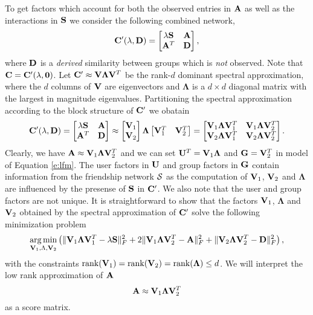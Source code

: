 To get factors which account for both the observed entries in $\mathbf{A}$ as well as the interactions in $\mathbf{S}$ we consider the following combined network,
\begin{equation}
\mathbf{C}'(\lambda, \mathbf{D}) =
\begin{bmatrix}
\lambda \mathbf{S} & \mathbf{A} \\
\mathbf{A}^T & \mathbf{D}
\end{bmatrix},
\label{e:generalizedCombined}
\end{equation}
where $\mathbf{D}$ is a \emph{derived} similarity between groups which is \emph{not} observed. Note that $\mathbf{C} = \mathbf{C}'(\lambda, \mathbf{0})$. Let $\mathbf{C}' \approx \mathbf{V} \mathbf{\Lambda} \mathbf{V}^T$ be the rank-$d$ dominant spectral approximation, where the $d$ columns of $\mathbf{V}$ are eigenvectors and $\mathbf{\Lambda}$ is a $d \times d$ diagonal matrix with the largest in magnitude eigenvalues. Partitioning the spectral approximation according to the block structure of $\mathbf{C}'$ we obatain 
\[
\mathbf{C}'(\lambda, \mathbf{D})  = 
\begin{bmatrix}
\lambda \mathbf{S} & \mathbf{A} \\
\mathbf{A}^T & \mathbf{D}
\end{bmatrix}
\approx 
 \begin{bmatrix}
 \mathbf{V}_1 \\
 \mathbf{V}_2
 \end{bmatrix}
\mathbf{\Lambda}
\begin{bmatrix}
\mathbf{V}_1^T & \mathbf{V}_2^T
\end{bmatrix} = 
\begin{bmatrix}
\mathbf{V}_1 \mathbf{\Lambda} \mathbf{V}_1^T & \mathbf{V}_1 \mathbf{\Lambda} \mathbf{V}_2^T  \\
\mathbf{V}_2 \mathbf{\Lambda} \mathbf{V}_1^T & \mathbf{V}_2 \mathbf{\Lambda} \mathbf{V}_2^T 
\end{bmatrix}.
\]
Clearly, we have $\mathbf{A} \approx \mathbf{V}_1 \mathbf{\Lambda} \mathbf{V}_2^T$ and we can set $\mathbf{U}^T = \mathbf{V}_1 \mathbf{\Lambda} $ and $ \mathbf{G} = \mathbf{V}_2^T$ in model of Equation \eqref{e:lfm}. The user factors in $\mathbf{U}$ and group factors in $\mathbf{G}$ contain information from the friendship network $\mathcal{S}$ as the computation of $\mathbf{V}_1$, $\mathbf{V}_2$ and $\mathbf{\Lambda}$ are influenced by the presense of $\mathbf{S}$ in $\mathbf{C}'$. We also note that the user and group factors are not unique. It is straightforward to show that the factors $\mathbf{V}_1$, $\mathbf{\Lambda}$ and $\mathbf{V}_2$ obtained by the spectral approximation of $\mathbf{C}'$ solve the following minimization problem 
\begin{equation}
\label{e:objective}
 \operatorname*{arg\,min}_{\mathbf{V}_1, \Lambda, \mathbf{V}_2} \left(\|\mathbf{V}_1 \mathbf{\Lambda} \mathbf{V}_1^T -\lambda \mathbf{S} \|_F^2 + 2\|\mathbf{V}_1 \mathbf{\Lambda} \mathbf{V}_2^T -\mathbf{A} \|_F^2 +  \|\mathbf{V}_2 \mathbf{\Lambda} \mathbf{V}_2^T - \mathbf{D}\|_F^2\right), 
\end{equation}
with the constraints $\operatorname{rank}(\mathbf{V}_1) = \operatorname{rank}(\mathbf{V}_2) = \operatorname{rank}(\mathbf{\Lambda}) \leq d$. We will interpret the low rank approximation of $\mathbf{A}$
\begin{equation}
\mathbf{A} \approx \mathbf{V}_1 \mathbf{\Lambda} \mathbf{V}_2^T
\label{e:LFM}
\end{equation}
as a score matrix.

